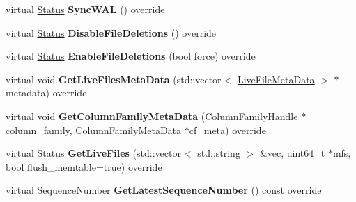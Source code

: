 \begin{DoxyCompactItemize}
\item 
virtual \hyperlink{classrocksdb_1_1Status}{Status} {\bfseries Sync\+W\+AL} () override\hypertarget{classrocksdb_1_1StackableDB_aaf21fc329c012edca8e054341156d09c}{}\label{classrocksdb_1_1StackableDB_aaf21fc329c012edca8e054341156d09c}

\item 
virtual \hyperlink{classrocksdb_1_1Status}{Status} {\bfseries Disable\+File\+Deletions} () override\hypertarget{classrocksdb_1_1StackableDB_aedfdf7f52f9338ed962c59f729eedda7}{}\label{classrocksdb_1_1StackableDB_aedfdf7f52f9338ed962c59f729eedda7}

\item 
virtual \hyperlink{classrocksdb_1_1Status}{Status} {\bfseries Enable\+File\+Deletions} (bool force) override\hypertarget{classrocksdb_1_1StackableDB_aa32f22d0261bcfb5fa61a300e4c89999}{}\label{classrocksdb_1_1StackableDB_aa32f22d0261bcfb5fa61a300e4c89999}

\item 
virtual void {\bfseries Get\+Live\+Files\+Meta\+Data} (std\+::vector$<$ \hyperlink{structrocksdb_1_1LiveFileMetaData}{Live\+File\+Meta\+Data} $>$ $\ast$metadata) override\hypertarget{classrocksdb_1_1StackableDB_abcaa46a5f4c2575e57b9470447ffef4c}{}\label{classrocksdb_1_1StackableDB_abcaa46a5f4c2575e57b9470447ffef4c}

\item 
virtual void {\bfseries Get\+Column\+Family\+Meta\+Data} (\hyperlink{classrocksdb_1_1ColumnFamilyHandle}{Column\+Family\+Handle} $\ast$column\+\_\+family, \hyperlink{structrocksdb_1_1ColumnFamilyMetaData}{Column\+Family\+Meta\+Data} $\ast$cf\+\_\+meta) override\hypertarget{classrocksdb_1_1StackableDB_af14fd184b4401ce8d4a837b0747e5039}{}\label{classrocksdb_1_1StackableDB_af14fd184b4401ce8d4a837b0747e5039}

\item 
virtual \hyperlink{classrocksdb_1_1Status}{Status} {\bfseries Get\+Live\+Files} (std\+::vector$<$ std\+::string $>$ \&vec, uint64\+\_\+t $\ast$mfs, bool flush\+\_\+memtable=true) override\hypertarget{classrocksdb_1_1StackableDB_ad40099da19c114c38347bcecc6031211}{}\label{classrocksdb_1_1StackableDB_ad40099da19c114c38347bcecc6031211}

\item 
virtual Sequence\+Number {\bfseries Get\+Latest\+Sequence\+Number} () const override\hypertarget{classrocksdb_1_1StackableDB_a0e1ff210c589c387ab5ac93f3f24671c}{}\label{classrocksdb_1_1StackableDB_a0e1ff210c589c387ab5ac93f3f24671c}


\end{DoxyCompactItemize}
